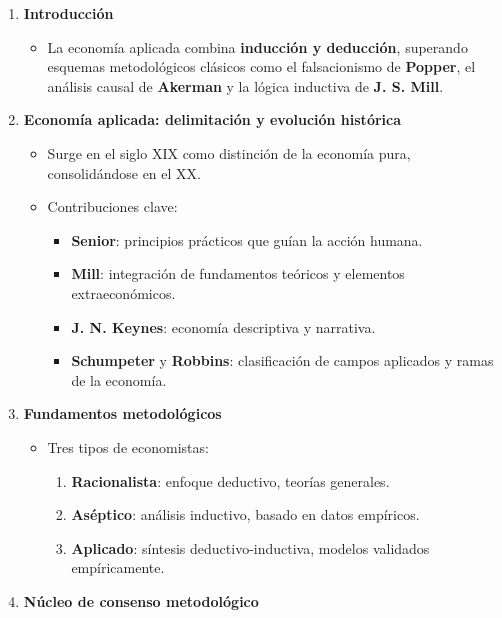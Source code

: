 \documentclass[12pt]{report} %
\providecommand{\tightlist}{%
  \setlength{\itemsep}{0pt}\setlength{\parskip}{0pt}}
\begin{document}
\begin{enumerate}
\def\labelenumi{\arabic{enumi}.}
\tightlist
\item
  \textbf{Introducción}

  \begin{itemize}
  \tightlist
  \item
    La economía aplicada combina \textbf{inducción y deducción},
    superando esquemas metodológicos clásicos como el falsacionismo de
    \textbf{Popper}, el análisis causal de \textbf{Akerman} y la lógica
    inductiva de \textbf{J. S. Mill}.
  \end{itemize}
\item
  \textbf{Economía aplicada: delimitación y evolución histórica}

  \begin{itemize}
  \tightlist
  \item
    Surge en el siglo XIX como distinción de la economía pura,
    consolidándose en el XX.
  \item
    Contribuciones clave:

    \begin{itemize}
    \tightlist
    \item
      \textbf{Senior}: principios prácticos que guían la acción humana.
    \item
      \textbf{Mill}: integración de fundamentos teóricos y elementos
      extraeconómicos.
    \item
      \textbf{J. N. Keynes}: economía descriptiva y narrativa.
    \item
      \textbf{Schumpeter} y \textbf{Robbins}: clasificación de campos
      aplicados y ramas de la economía.
    \end{itemize}
  \end{itemize}
\item
  \textbf{Fundamentos metodológicos}

  \begin{itemize}
  \tightlist
  \item
    Tres tipos de economistas:

    \begin{enumerate}
    \def\labelenumii{\arabic{enumii}.}
    \tightlist
    \item
      \textbf{Racionalista}: enfoque deductivo, teorías generales.
    \item
      \textbf{Aséptico}: análisis inductivo, basado en datos empíricos.
    \item
      \textbf{Aplicado}: síntesis deductivo-inductiva, modelos validados
      empíricamente.
    \end{enumerate}
  \end{itemize}
\item
  \textbf{Núcleo de consenso metodológico}


\end{enumerate}
\end{document}

